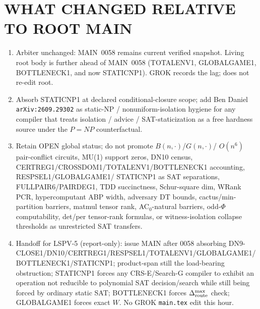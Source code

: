 \documentclass[11pt]{article}
\begin{document}
\section*{WHAT CHANGED RELATIVE TO ROOT MAIN}
\begin{enumerate}
\item Arbiter unchanged: MAIN~0058 remains current verified snapshot. Living root
body is further ahead of MAIN~0058 (TOTALENV1, GLOBALGAME1, BOTTLENECK1, and now
STATICNP1). GROK records the lag; does not re-edit root.
\item Absorb STATICNP1 at declared conditional-closure scope; add Ben Daniel
\texttt{arXiv:2609.29302} as static-NP / nonuniform-isolation hygiene for any
compiler that treats isolation / advice / SAT-staticization as a free hardness
source under the $P=NP$ counterfactual.
\item Retain OPEN global status; do not promote $B(n,\cdot)$/$G(n,\cdot)$/
$O(n^6)$ pair-conflict circuits, MU(1) support zeros, DN10 census,
CERTREG1/CROSSDOM1/TOTALENV1/BOTTLENECK1 accounting, RESPSEL1/GLOBALGAME1/
STATICNP1 as SAT separations, FULLPAIR6/PAIRDEG1, TDD succinctness, Schur-square
dim, WRank PCR, hypercomputant ABP width, adversary DT bounds, cactus/min-partition
barriers, matmul tensor rank, AC$_0$-natural barriers, odd-$\Phi$ computability,
det/per tensor-rank formulas, or witness-isolation collapse thresholds as
unrestricted SAT transfers.
\item Handoff for LSPV-5 (report-only): issue MAIN after 0058 absorbing
DN9-CLOSE1/DN10/CERTREG1/RESPSEL1/TOTALENV1/GLOBALGAME1/BOTTLENECK1/STATICNP1;
product-span still the load-bearing obstruction; STATICNP1 forces any CRS-E/Search-G
compiler to exhibit an operation not reducible to polynomial SAT decision/search
while still being forced by ordinary static SAT; BOTTLENECK1 forces
$\Delta_{\rm route}^{\max}$ check; GLOBALGAME1 forces exact $W$. No GROK
\texttt{main.tex} edit this hour.
\end{enumerate}
\end{document}
